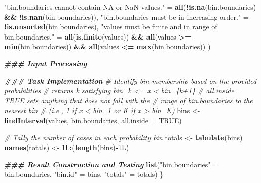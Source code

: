 \documentclass[
]{book}
\newenvironment{Shaded}{\begin{snugshade}}{\end{snugshade}}
\newcommand{\AttributeTok}[1]{\textcolor[rgb]{0.13,0.29,0.53}{#1}}
\newcommand{\CommentTok}[1]{\textcolor[rgb]{0.56,0.35,0.01}{\textit{#1}}}
\newcommand{\ConstantTok}[1]{\textcolor[rgb]{0.56,0.35,0.01}{#1}}
\newcommand{\DocumentationTok}[1]{\textcolor[rgb]{0.56,0.35,0.01}{\textbf{\textit{#1}}}}
\newcommand{\FunctionTok}[1]{\textcolor[rgb]{0.13,0.29,0.53}{\textbf{#1}}}
\newcommand{\NormalTok}[1]{#1}
\newcommand{\OtherTok}[1]{\textcolor[rgb]{0.56,0.35,0.01}{#1}}
\newcommand{\SpecialCharTok}[1]{\textcolor[rgb]{0.81,0.36,0.00}{\textbf{#1}}}
\newcommand{\StringTok}[1]{\textcolor[rgb]{0.31,0.60,0.02}{#1}}
\begin{document}
\begin{Shaded}
\begin{Highlighting}[]
    \StringTok{"\textasciigrave{}bin.boundaries\textasciigrave{} cannot contain NA or NaN values."} \OtherTok{=} 
      \FunctionTok{all}\NormalTok{(}\SpecialCharTok{!}\FunctionTok{is.na}\NormalTok{(bin.boundaries) }\SpecialCharTok{\&\&} \SpecialCharTok{!}\FunctionTok{is.nan}\NormalTok{(bin.boundaries)),}
    \StringTok{"\textasciigrave{}bin.boundaries\textasciigrave{} must be in increasing order."} \OtherTok{=} \SpecialCharTok{!}\FunctionTok{is.unsorted}\NormalTok{(bin.boundaries),}
    \StringTok{"\textasciigrave{}values\textasciigrave{} must be finite and in range of \textasciigrave{}bin.boundaries\textasciigrave{}."} \OtherTok{=} 
      \FunctionTok{all}\NormalTok{(}\FunctionTok{is.finite}\NormalTok{(values)) }\SpecialCharTok{\&\&} \FunctionTok{all}\NormalTok{(values }\SpecialCharTok{\textgreater{}=} \FunctionTok{min}\NormalTok{(bin.boundaries)) }\SpecialCharTok{\&\&} 
      \FunctionTok{all}\NormalTok{(values }\SpecialCharTok{\textless{}=} \FunctionTok{max}\NormalTok{(bin.boundaries))}
\NormalTok{  )}
  
  \DocumentationTok{\#\#\# Input Processing}
  
  \DocumentationTok{\#\#\# Task Implementation}
  \CommentTok{\# Identify bin membership based on the provided probabilities}
  \CommentTok{\# returns k satisfying bin\_k \textless{}= x \textless{} bin\_\{k+1\}}
  \CommentTok{\# all.inside = TRUE sets anything that does not fall with the}
  \CommentTok{\# range of bin.boundaries to the nearest bin }
  \CommentTok{\# (i.e., 1 if x \textless{} bin\_1 or K if x \textgreater{} bin\_K)}
\NormalTok{  bins }\OtherTok{\textless{}{-}} \FunctionTok{findInterval}\NormalTok{(values, bin.boundaries, }\AttributeTok{all.inside =} \ConstantTok{TRUE}\NormalTok{)}
  
  \CommentTok{\# Tally the number of cases in each probability bin}
\NormalTok{  totals        }\OtherTok{\textless{}{-}} \FunctionTok{tabulate}\NormalTok{(bins)}
  \FunctionTok{names}\NormalTok{(totals) }\OtherTok{\textless{}{-}}\NormalTok{ 1L}\SpecialCharTok{:}\NormalTok{(}\FunctionTok{length}\NormalTok{(bins)}\SpecialCharTok{{-}}\NormalTok{1L)}
  
  \DocumentationTok{\#\#\# Result Construction and Testing}
  \FunctionTok{list}\NormalTok{(}\StringTok{"bin.boundaries"} \OtherTok{=}\NormalTok{ bin.boundaries, }
       \StringTok{"bin.id"}         \OtherTok{=}\NormalTok{ bins, }
       \StringTok{"totals"}         \OtherTok{=}\NormalTok{ totals)}
\NormalTok{\}}
\end{Highlighting}
\end{Shaded}
\end{document}
